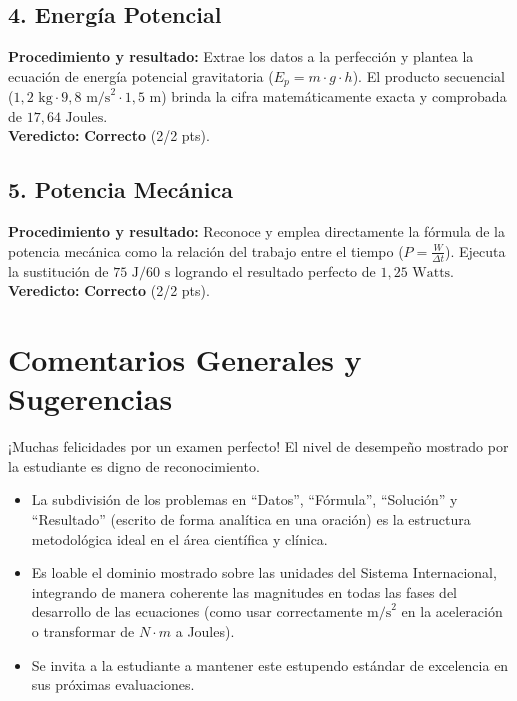\documentclass[12pt,letterpaper]{article}
\begin{document}
\subsection*{4. Energía Potencial}
\textbf{Procedimiento y resultado:} Extrae los datos a la perfección y plantea la ecuación de energía potencial gravitatoria ($E_p = m \cdot g \cdot h$). El producto secuencial ($1,2 \text{ kg} \cdot 9,8 \text{ m/s}^2 \cdot 1,5 \text{ m}$) brinda la cifra matemáticamente exacta y comprobada de $17,64 \text{ Joules}$. \\
\textbf{Veredicto:} \textbf{Correcto} (2/2 pts).

\subsection*{5. Potencia Mecánica}
\textbf{Procedimiento y resultado:} Reconoce y emplea directamente la fórmula de la potencia mecánica como la relación del trabajo entre el tiempo ($P = \frac{W}{\Delta t}$). Ejecuta la sustitución de $75 \text{ J} / 60 \text{ s}$ logrando el resultado perfecto de $1,25 \text{ Watts}$. \\
\textbf{Veredicto:} \textbf{Correcto} (2/2 pts).

\vspace{0.5cm}
\section*{Comentarios Generales y Sugerencias}
¡Muchas felicidades por un examen perfecto! El nivel de desempeño mostrado por la estudiante es digno de reconocimiento.
\begin{itemize}
    \item La subdivisión de los problemas en ``Datos'', ``Fórmula'', ``Solución'' y ``Resultado'' (escrito de forma analítica en una oración) es la estructura metodológica ideal en el área científica y clínica.
    \item Es loable el dominio mostrado sobre las unidades del Sistema Internacional, integrando de manera coherente las magnitudes en todas las fases del desarrollo de las ecuaciones (como usar correctamente $\text{m/s}^2$ en la aceleración o transformar de $N \cdot m$ a Joules).
    \item Se invita a la estudiante a mantener este estupendo estándar de excelencia en sus próximas evaluaciones.
\end{itemize}
\end{document}
